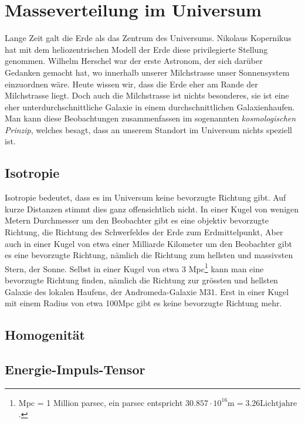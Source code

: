 \section{Masseverteilung im Universum}
Lange Zeit galt die Erde als das Zentrum des Universums.
Nikolaus Kopernikus hat mit dem heliozentrischen Modell der Erde
diese privilegierte Stellung genommen.
Wilhelm Herschel war der erste Astronom, der sich darüber Gedanken
gemacht hat, wo innerhalb unserer Milchstrasse unser Sonnensystem
einzuordnen wäre.
Heute wissen wir, dass die Erde eher am Rande der Milchstrasse liegt.
Doch auch die Milchstrasse ist nichts besonderes, sie ist eine eher
unterdurchschnittliche Galaxie in einem durchschnittlichen
Galaxienhaufen.
Man kann diese Beobachtungen zusammenfassen im sogenannten
{\em kosmologischen Prinzip}, welches besagt, dass an unserem
Standort im Universum nichts speziell ist.

\subsection{Isotropie}
Isotropie bedeutet, dass es im Universum keine bevorzugte Richtung
gibt.
Auf kurze Distanzen stimmt dies ganz offensichtlich nicht.
In einer Kugel von wenigen Metern Durchmesser um den Beobachter
gibt es eine objektiv bevorzugte Richtung, die Richtung des Schwerfeldes
der Erde zum Erdmittelpunkt,
Aber auch in einer Kugel von etwa einer Milliarde Kilometer um
den Beobachter gibt es eine bevorzugte Richtung, nämlich die
Richtung zum hellsten und massivsten Stern, der Sonne.
Selbst in einer Kugel von etwa 3 Mpc\footnote{Mpc = 1 Million parsec,
ein parsec entspricht $30.857\cdot 10^{16}\text{m} = 3.26\text{Lichtjahre}$.}
kann man eine bevorzugte Richtung finden, nämlich die Richtung zur grössten
und hellsten Galaxie des lokalen Haufens, der Andromeda-Galaxie M31.
Erst in einer Kugel mit einem Radius von etwa 100Mpc gibt es keine
bevorzugte Richtung mehr. 

\subsection{Homogenität}

\subsection{Energie-Impuls-Tensor}

